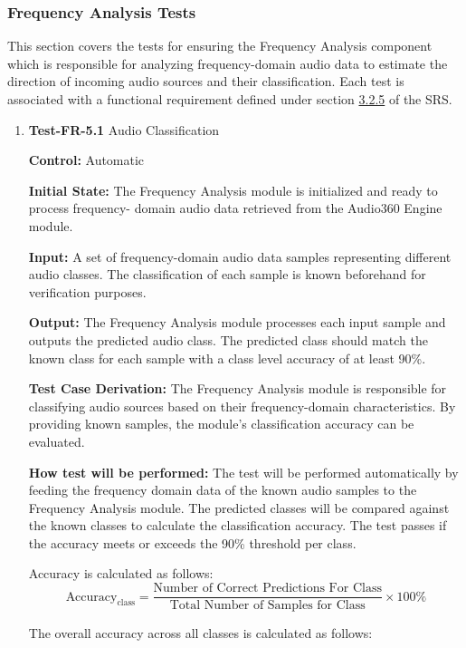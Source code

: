 \documentclass[12pt, titlepage]{article}
\begin{document}
\subsubsection{Frequency Analysis Tests}

This section covers the tests for ensuring the Frequency Analysis component
which is responsible for analyzing frequency-domain audio data to estimate the
direction of incoming audio sources and their classification. Each test is
associated with a functional requirement defined under section
\hyperref[SRS-sec:FR5]{3.2.5} of the SRS.
\begin{enumerate}

\label{sec:freq-analysis-tests}
\item{\textbf{Test-FR-5.1} Audio Classification\\}

\textbf{Control:} Automatic

\textbf{Initial State:}
The Frequency Analysis module is initialized and ready to process frequency-
domain audio data retrieved from the Audio360 Engine module. 

\textbf{Input:}
A set of frequency-domain audio data samples representing different audio
classes. The classification of each 
sample is known beforehand for verification purposes.

\textbf{Output:}
The Frequency Analysis module processes each input sample and outputs the
predicted audio class. The predicted class should match the known class for
each sample with a class level accuracy of at least 90\%.

\textbf{Test Case Derivation:}
The Frequency Analysis module is responsible for classifying audio sources
based on their frequency-domain characteristics. By providing known samples,
the module's classification accuracy can be evaluated.

\textbf{How test will be performed:}
The test will be performed automatically by feeding the frequency
domain data of the known audio samples to the Frequency Analysis module. The
predicted classes will be compared against the known classes to calculate
the classification accuracy. The test passes if the accuracy meets or exceeds
the 90\% threshold per class.

Accuracy is calculated as follows:
\[
\text{Accuracy}_{\text{class}} = \frac{\text{Number of Correct Predictions For Class}}{\text{Total Number of Samples for Class}} \times 100\%
\]

The overall accuracy across all classes is calculated as follows:


\end{enumerate}
\end{document}
